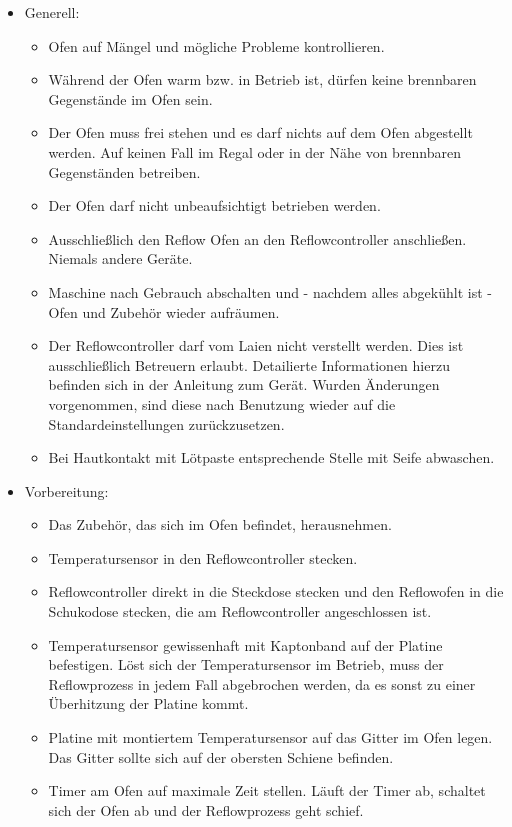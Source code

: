 \documentclass[fontsize=9pt]{scrartcl}
\newenvironment{smallitemize}{\begin{itemize}\itemsep -3pt}{\end{itemize}}
\begin{document}
\begin{itemize}
	\item Generell:
	\begin{smallitemize}
		\item Ofen auf Mängel und mögliche Probleme kontrollieren.
		\item Während der Ofen warm bzw. in Betrieb ist, dürfen keine brennbaren Gegenstände im Ofen sein. 
		\item Der Ofen muss frei stehen und es darf nichts auf dem Ofen abgestellt werden. Auf keinen Fall im Regal oder in der Nähe von brennbaren Gegenständen betreiben.
		\item Der Ofen darf nicht unbeaufsichtigt betrieben werden.
		\item Ausschließlich den Reflow Ofen an den Reflowcontroller anschließen. Niemals andere Geräte.
		\item Maschine nach Gebrauch abschalten und - nachdem alles abgekühlt ist - Ofen und Zubehör wieder aufräumen.
		\item Der Reflowcontroller darf vom Laien nicht verstellt werden. Dies ist ausschließlich Betreuern erlaubt. Detailierte Informationen hierzu befinden sich in der Anleitung zum Gerät. Wurden Änderungen vorgenommen, sind diese nach Benutzung wieder auf die Standardeinstellungen zurückzusetzen.
		\item Bei Hautkontakt mit Lötpaste entsprechende Stelle mit Seife abwaschen. 
		\end{smallitemize}
	\item Vorbereitung:
	\begin{smallitemize}
		\item Das Zubehör, das sich im Ofen befindet, herausnehmen.
		\item Temperatursensor in den Reflowcontroller stecken.
		\item Reflowcontroller direkt in die Steckdose stecken und den Reflowofen in die Schukodose stecken, die am Reflowcontroller angeschlossen ist.
		\item Temperatursensor gewissenhaft mit Kaptonband auf der Platine befestigen. Löst sich der Temperatursensor im Betrieb, muss der Reflowprozess in jedem Fall abgebrochen werden, da es sonst zu einer Überhitzung der Platine kommt.
		\item Platine mit montiertem Temperatursensor auf das Gitter im Ofen legen. Das Gitter sollte sich auf der obersten Schiene befinden.
		\item Timer am Ofen auf maximale Zeit stellen. Läuft der Timer ab, schaltet sich der Ofen ab und der Reflowprozess geht schief.


\end{smallitemize}
\end{itemize}
\end{document}
